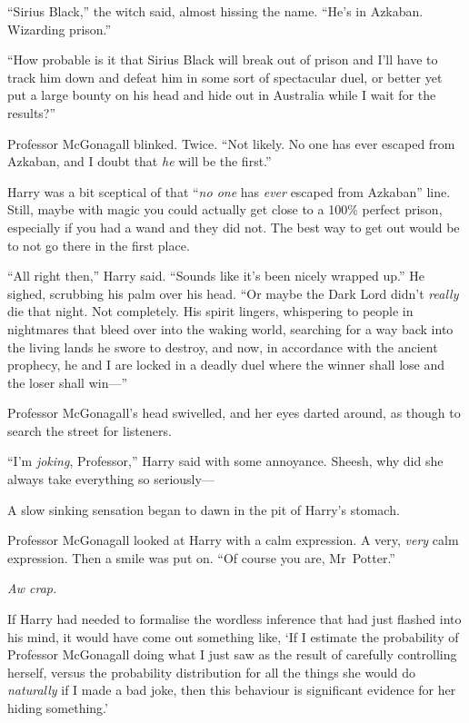 “Sirius Black,” the witch said, almost hissing the name. “He’s in Azkaban. Wizarding prison.”

“How probable is it that Sirius Black will break out of prison and I’ll have to track him down and defeat him in some sort of spectacular duel, or better yet put a large bounty on his head and hide out in Australia while I wait for the results?”

Professor McGonagall blinked. Twice. “Not likely. No one has ever escaped from Azkaban, and I doubt that \emph{he} will be the first.”

Harry was a bit sceptical of that “\emph{no one} has \emph{ever} escaped from Azkaban” line. Still, maybe with magic you could actually get close to a 100\% perfect prison, especially if you had a wand and they did not. The best way to get out would be to not go there in the first place.

“All right then,” Harry said. “Sounds like it’s been nicely wrapped up.” He sighed, scrubbing his palm over his head. “Or maybe the Dark Lord didn’t \emph{really} die that night. Not completely. His spirit lingers, whispering to people in nightmares that bleed over into the waking world, searching for a way back into the living lands he swore to destroy, and now, in accordance with the ancient prophecy, he and I are locked in a deadly duel where the winner shall lose and the loser shall win—”

Professor McGonagall’s head swivelled, and her eyes darted around, as though to search the street for listeners.

“I’m \emph{joking}, Professor,” Harry said with some annoyance. Sheesh, why did she always take everything so seriously—

A slow sinking sensation began to dawn in the pit of Harry’s stomach.

Professor McGonagall looked at Harry with a calm expression. A very, \emph{very} calm expression. Then a smile was put on. “Of course you are, Mr~Potter.”

\emph{Aw crap.}

If Harry had needed to formalise the wordless inference that had just flashed into his mind, it would have come out something like, ‘If I estimate the probability of Professor McGonagall doing what I just saw as the result of carefully controlling herself, versus the probability distribution for all the things she would do \emph{naturally} if I made a bad joke, then this behaviour is significant evidence for her hiding something.’


